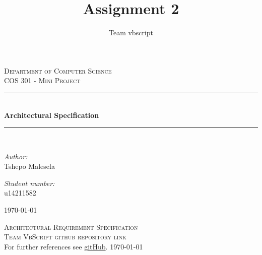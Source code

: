\documentclass[a4paper,12pt]{report}
\author{Team vbscript}
\title{ Assignment 2}
\newcommand{\HRule}{\rule{\linewidth}{0.5mm}}
\begin{document}
\setlength{\parskip}{6pt}

\begin{titlepage}

\begin{center}
  
\textsc{\LARGE Department of Computer Science}\\[1.5cm]
\textsc{\Large COS 301 - Mini Project}\\[0.5cm]
\HRule \\[0.4cm]
{ \huge \bfseries Architectural Specification}\\[0.4cm]
\HRule \\[0.4cm]
\begin{minipage}{0.4\textwidth}
\begin{flushleft} \large
\emph{Author:}\\
Tshepo {Malesela}
\end{flushleft}
\end{minipage}
\begin{minipage}{0.4\textwidth}
\begin{flushright} \large
\emph{Student number:} \\
u14211582
\end{flushright}
\end{minipage}

\vfill

{\large \today}
\end{center}
\end{titlepage}
\footnotesize
\normalsize

\renewcommand{\thesection}{\arabic{section}}

\begin{center}
\tableofcontents
\footnotesize
\normalsize  
\end{center}

\renewcommand{\thesection}{\arabic{section}}
\newpage
\begin{center}
	\textsc{\LARGE Architectural Requirement Specification}\\[1.5cm]
	\textsc{\Large Team VbScript github repository link}\\[0.5cm]
	For further references see \href{https://github.com/mfanamasimula/VBScript}{gitHub}.
	\today
\end{center}
\newpage
\end{document}
